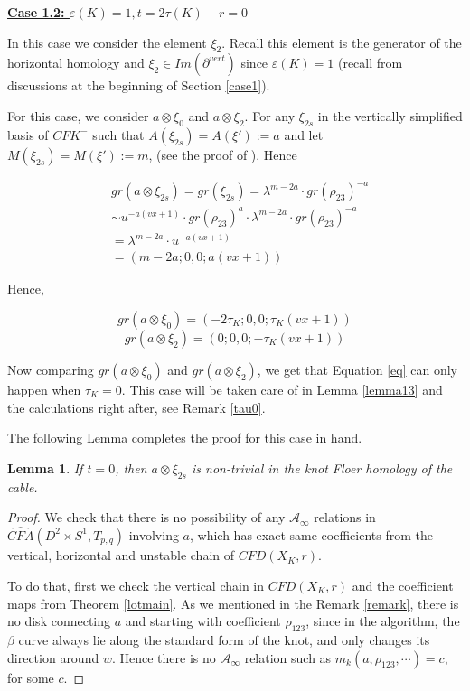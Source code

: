 \documentclass[11pt,reqno]{amsart}
\newtheorem {lemma}[theorem]{Lemma}
\theoremstyle{definition}
\newtheorem *{remark}{Remark}
\newcommand{\cfahat}{\widehat{\mathit{CFA}}}
\newcommand{\cfdhat}{\widehat{\mathit{CFD}}}
\newcommand{\cfkminus}{\mathit{CFK}^{-}}
\begin{document}
 
\begin{subsection}{\underline{\textbf{Case 1.2: $\varepsilon(K)=1, t = 2 \tau(K) - r=0$}}}



In this case we consider the element $\xi_2$. Recall this element is the generator of the horizontal homology and $\xi_2 \in Im(\partial^{vert})$ since $\varepsilon(K) = 1$ (recall from discussions at the beginning of Section \ref{case1}). 

For this case, we consider $a \otimes \xi_0$ and $a \otimes \xi_2$. For any $\xi_{2s}$ in the vertically simplified basis of $\cfkminus$ such that $A(\xi_{2s}) = A(\xi') := a$ and let $M(\xi_{2s}) = M(\xi') := m$, (see the proof of \cite[Lemma 2.1]{hom11}). Hence

\begin{align*}
    &gr(a \otimes \xi_{2s}) = gr(\xi_{2s}) = \lambda^{m-2a} \cdot gr(\rho_{23})^{-a} \\
& \sim u^{-a(vx+1)} \cdot gr(\rho_{23})^a \cdot  \lambda^{m-2a} \cdot gr(\rho_{23})^{-a} \\
&= \lambda^{m-2a} \cdot u^{-a(vx+1)} \\
&= (m-2a;0,0; a(vx+1))
\end{align*}


Hence,

\[gr(a\otimes \xi_0) = (-2\tau_K;0,0;\tau_K(vx+1))\]
\[gr(a \otimes \xi_2) = (0;0,0;-\tau_K(vx+1))\]


Now comparing $gr(a \otimes \xi_0)$ and $gr(a \otimes \xi_2)$, we get that Equation \ref{eq} can only happen when $\tau_K = 0$. This case will be taken care of in Lemma \ref{lemma13} and the calculations right after, see Remark \ref{tau0}.

\bigskip

The following Lemma completes the proof for this case in hand.

\begin{lemma}
\label{lemma14}
  If $t = 0$,
then $a \otimes \xi_{2s}$ is non-trivial in the knot Floer homology of the cable.
\end{lemma}

\begin{proof} We check that there is no possibility of any $\mathcal{A}_{\infty}$ relations in $\cfahat(D^2 \times S^1, T_{p,q})$ involving $a$, which has exact same coefficients from the vertical, horizontal and unstable chain of $\cfdhat(X_K,r)$.

To do that, first we check the vertical chain in $\cfdhat(X_K,r)$ and the coefficient maps from Theorem \ref{lotmain}. As we mentioned in the Remark \ref{remark}, there is no disk connecting $a$ and starting with coefficient $\rho_{123}$, since in the algorithm, the $\beta$ curve always lie along the standard form of the knot, and only changes its direction around $w$. Hence there is no $\mathcal{A}_{\infty}$ relation such as $m_k(a,\rho_{123},\cdots) = c$, for some $c$.


\end{proof}
\end{subsection}
\end{document}
